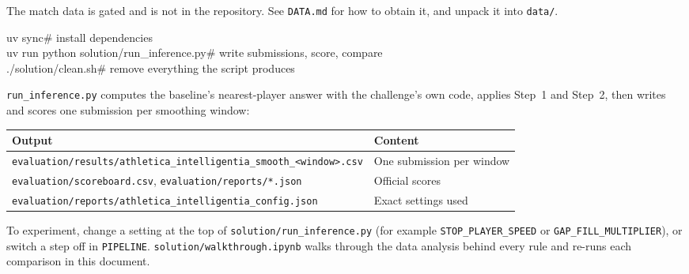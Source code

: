 \documentclass[10pt,a4paper]{article}
\newcommand{\lbl}[1]{\texttt{#1}}
\begin{document}
The match data is gated and is not in the repository. See \lbl{DATA.md} for how to obtain it, and unpack it into
\lbl{data/}.

\begin{tcolorbox}[colback=note, colframe=rule, boxrule=0.4pt, sharp corners, left=6pt]
\small\ttfamily
uv sync\hfill\textcolor{ink2}{\# install dependencies}\\
uv run python solution/run\_inference.py\hfill\textcolor{ink2}{\# write submissions, score, compare}\\
./solution/clean.sh\hfill\textcolor{ink2}{\# remove everything the script produces}
\end{tcolorbox}

\lbl{run\_inference.py} computes the baseline's nearest-player answer with the challenge's own code, applies
Step~1 and Step~2, then writes and scores one submission per smoothing window:

\begin{table}[H]
\small
\begin{tabularx}{\linewidth}{@{}>{\footnotesize}p{10.2cm}Y@{}}
\toprule
\normalsize\small\textbf{Output} & \textbf{Content} \\
\midrule
\lbl{evaluation/results/athletica\_intelligentia\_smooth\_<window>.csv} & One submission per window \\
\lbl{evaluation/scoreboard.csv}, \lbl{evaluation/reports/*.json} & Official scores \\
\lbl{evaluation/reports/athletica\_intelligentia\_config.json} & Exact settings used \\
\bottomrule
\end{tabularx}
\end{table}

To experiment, change a setting at the top of \lbl{solution/run\_inference.py} (for example
\lbl{STOP\_PLAYER\_SPEED} or \lbl{GAP\_FILL\_MULTIPLIER}), or switch a step off in \lbl{PIPELINE}.
\lbl{solution/walkthrough.ipynb} walks through the data analysis behind every rule and re-runs each comparison
in this document.
\end{document}
